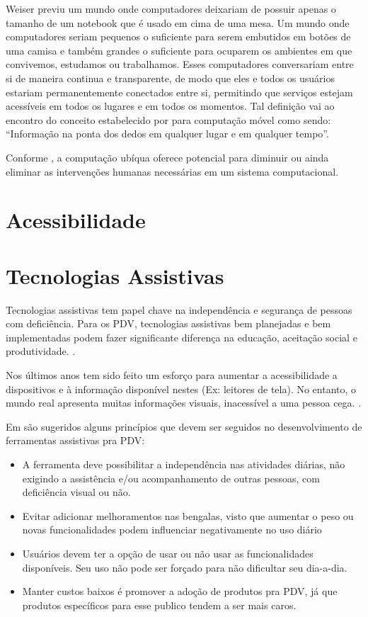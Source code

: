 \documentclass[english,brazilian]{UNISINOSmonografia}
\begin{document}
Weiser previu um mundo onde computadores deixariam de possuir apenas o tamanho de um notebook que é usado em cima de uma mesa. Um mundo onde computadores seriam pequenos o suficiente para serem embutidos em botões de uma camisa e também grandes o suficiente para ocuparem os ambientes em que convivemos, estudamos ou trabalhamos. Esses computadores conversariam entre si de maneira continua e transparente, de modo que eles e todos os usuários estariam permanentemente conectados entre si, permitindo que serviços estejam acessíveis em todos os lugares e em todos os momentos. Tal definição vai ao encontro do conceito estabelecido por  para computação móvel como sendo: “Informação na ponta dos dedos em qualquer lugar e em qualquer tempo”.

Conforme , a computação ubíqua oferece potencial para diminuir ou ainda eliminar as intervenções humanas necessárias em um sistema computacional.
	
	\section{Acessibilidade}

	\section{Tecnologias Assistivas}
Tecnologias assistivas tem papel chave na independência e segurança de pessoas com deficiência. Para os PDV, tecnologias assistivas bem planejadas e bem implementadas podem fazer significante diferença na educação, aceitação social e produtividade. \cite{dias2015navpal}.

Nos últimos anos tem sido feito um esforço para aumentar a acessibilidade a dispositivos e à informação disponível nestes (Ex: leitores de tela). No entanto, o mundo real apresenta muitas informações visuais, inacessível a uma pessoa cega. \cite{ucat2014}.

Em  são sugeridos alguns princípios que devem ser seguidos no desenvolvimento de ferramentas assistivas pra PDV:
\begin{itemize}
	\item A ferramenta deve possibilitar a independência nas atividades diárias, não exigindo a assistência e/ou acompanhamento de outras pessoas, com deficiência visual ou não.
	\item Evitar adicionar melhoramentos nas bengalas, visto que aumentar o peso ou novas funcionalidades podem influenciar negativamente no uso diário
	\item Usuários devem ter a opção de usar ou não usar as funcionalidades disponíveis. Seu uso não pode ser forçado para não dificultar seu dia-a-dia.
	\item Manter custos baixos é promover a adoção de produtos pra PDV, já que produtos específicos para esse publico tendem a ser mais caros.
\end{itemize}
\end{document}

